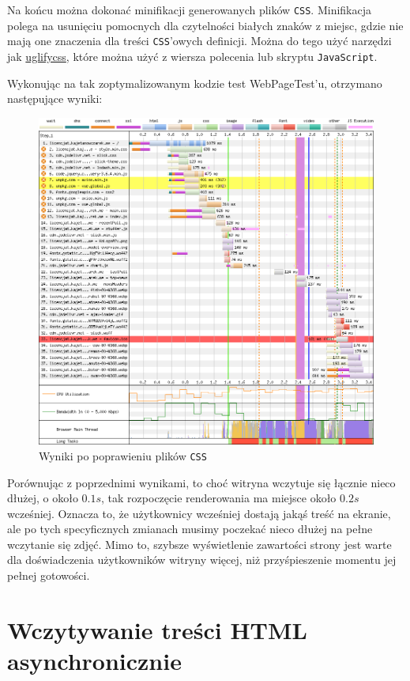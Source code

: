 \documentclass[licencjacka]{pracadypl}
\begin{document}
Na końcu można dokonać minifikacji generowanych plików \texttt{CSS}. Minifikacja polega na usunięciu pomocnych dla czytelności białych znaków z miejsc, gdzie nie mają one znaczenia dla treści \texttt{CSS}'owych definicji. Można do tego użyć narzędzi jak \href{https://www.npmjs.com/package/uglifycss}{uglifycss}, które można użyć z wiersza polecenia lub skryptu \texttt{JavaScript}.

Wykonując na tak zoptymalizowanym kodzie test WebPageTest'u, otrzymano następujące wyniki:

\begin{figure}[H]
  \centering
  \includegraphics[width=\linewidth]{images/waterfall-after-css.png}
  \caption{Wyniki po poprawieniu plików \texttt{CSS}}
  \label{fig:waterfall-after-css}
\end{figure}

Porównując z poprzednimi wynikami, to choć witryna wczytuje się łącznie nieco dłużej, o około $0.1s$, tak rozpoczęcie renderowania ma miejsce około $0.2s$ wcześniej. Oznacza to, że użytkownicy wcześniej dostają jakąś treść na ekranie, ale po tych specyficznych zmianach musimy poczekać nieco dłużej na pełne wczytanie się zdjęć. Mimo to, szybsze wyświetlenie zawartości strony jest warte dla doświadczenia użytkowników witryny więcej, niż przyśpieszenie momentu jej pełnej gotowości.

\section{Wczytywanie treści HTML asynchronicznie}
\end{document}
